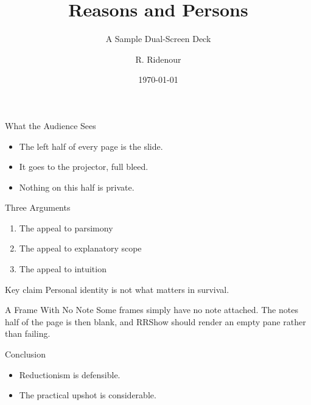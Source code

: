 \documentclass[aspectratio=169]{beamer}
\title{Reasons and Persons}
\subtitle{A Sample Dual-Screen Deck}
\author{R. Ridenour}
\institute{RRShow Test Fixture}
\date{\today}
\begin{document}
\begin{frame}
  \titlepage
\end{frame}

\begin{frame}{What the Audience Sees}
  \begin{itemize}
    \item The left half of every page is the slide.
    \item It goes to the projector, full bleed.
    \item Nothing on this half is private.
  \end{itemize}
\end{frame}

\begin{frame}{Three Arguments}
  \begin{enumerate}
    \item The appeal to parsimony
    \item The appeal to explanatory scope
    \item The appeal to intuition
  \end{enumerate}
  \vfill
  \begin{block}{Key claim}
    Personal identity is not what matters in survival.
  \end{block}
\end{frame}

\begin{frame}{A Frame With No Note}
  Some frames simply have no note attached. The notes half of the page is then
  blank, and RRShow should render an empty pane rather than failing.
\end{frame}

\begin{frame}{Conclusion}
  \begin{itemize}
    \item Reductionism is defensible.
    \item The practical upshot is considerable.
  \end{itemize}
\end{frame}
\end{document}
